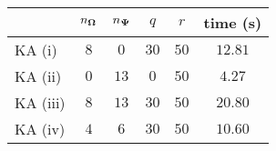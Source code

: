 \centering
\renewcommand{\arraystretch}{1.2}
\begin{tabular}{@{}lccccc@{}}
\toprule
 & $n_{\boldsymbol{\Omega}}$ & $n_{\boldsymbol{\Psi}}$ & $q$ & $r$ & time (s)\\
\midrule
KA (i) & $8$ & $0$ & $30$ & $50$ & $12.81$ \\
KA (ii) & $0$ & $13$ & $0$ & $50$ & $4.27$ \\
KA (iii) & $8$ & $13$ & $30$ & $50$ & $20.80$ \\
KA (iv) & $4$ & $6$ & $30$ & $50$ & $10.60$ \\
\bottomrule
\end{tabular}
